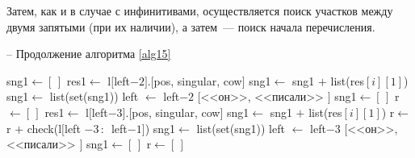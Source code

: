 \documentclass[main]{subfiles}
\begin{document}
Затем, как и в случае с инфинитивами, осуществляется поиск участков между двумя запятыми (при их наличии), а затем~--- поиск начала перечисления.
\begin{algorithm}
	\caption{-- Продолжение алгоритма \ref{alg15}}\label{alg16}
	\begin{algorithmic}[1]
		\State sng1$\gets [\, ]$
		\State res1$\gets$ l$[$left$-2]$.$[$pos, singular, cow$]$
		\State sng1$\gets$ sng1 $+$ list(res$[i][1]$)
		\EndIf
		\EndFor
		\State sng1$\gets$ list(set(sng1))
		\State left $\gets$ left$-2$
		\Else
		\State \Return $[$<<он>>, <<писали>> $]$
		\EndIf
		\State sng1$\gets [\, ]$
		\State r$\gets [\, ]$
		\State res1$\gets$ l$[$left$-3]$.$[$pos, singular, cow$]$
		\State sng1$\gets$ sng1 $+$ list(res$[i][1]$)
		\State r$\gets$ r $+$ check(l$[$left $-3\, :\, $ left$-1 ]$)
		\EndIf
		\EndFor
		\State sng1$\gets$ list(set(sng1))
		\State left $\gets$ left$-3$
		\Else
		\State \Return $[$<<он>>, <<писали>> $]$
		\EndIf
		\State sng1$\gets [\, ]$
		\State r$\gets [\, ]$
	\end{algorithmic}
\end{algorithm}
\end{document}
